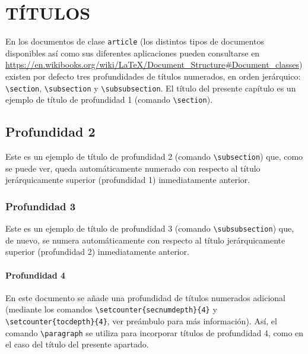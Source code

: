 \documentclass[a4paper, 11pt, spanish, twoside]{article}
\begin{document}

\newpage



\section{TÍTULOS} \label{sec:titulos}

En los documentos de clase \texttt{article} (los distintos tipos de documentos disponibles así como sus diferentes aplicaciones pueden consultarse en \url{https://en.wikibooks.org/wiki/LaTeX/Document_Structure#Document_classes}) existen por defecto tres profundidades de títulos numerados, en orden jerárquico: \texttt{\textbackslash section}, \texttt{\textbackslash subsection} y \texttt{\textbackslash subsubsection}. El título del presente capítulo es un ejemplo de título de profundidad 1 (comando \texttt{\textbackslash section}).


\subsection{Profundidad 2}

Este es un ejemplo de título de profundidad 2 (comando \texttt{\textbackslash subsection}) que, como se puede ver, queda automáticamente numerado con respecto al título jerárquicamente superior (profundidad 1) inmediatamente anterior.


\subsubsection{Profundidad 3}

Este es un ejemplo de título de profundidad 3 (comando \texttt{\textbackslash subsubsection}) que, de nuevo, se numera automáticamente con respecto al título jerárquicamente superior (profundidad 2) inmediatamente anterior.


\paragraph{Profundidad 4}

En este documento se añade una profundidad de títulos numerados adicional (mediante los comandos \texttt{\textbackslash setcounter\{secnumdepth\}\{4\}} y \texttt{\textbackslash setcounter\{tocdepth\}\{4\}}, ver preámbulo para más información). Así, el comando \texttt{\textbackslash paragraph} se utiliza para incorporar títulos de profundidad 4, como en el caso del título del presente apartado. 
\end{document}
